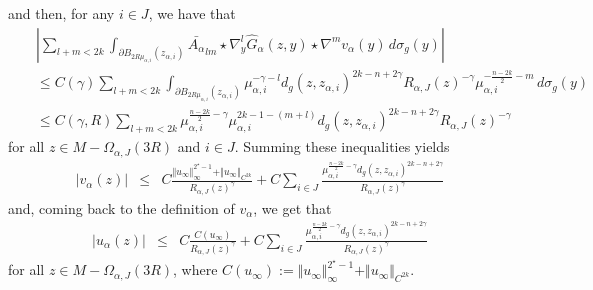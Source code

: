 \documentclass[reqno]{amsart}
\def \crit {2^\star}
\def \ua {u_\alpha}
\def \va {v_\alpha}
\def \mai {\mu_{\alpha,i}}
\def \zai {z_{\alpha,i}}
\begin{document}
and then, for any $i\in J$, we have that
\begin{eqnarray}
&&\left|\sum_{l+m<2k}\int_{\partial B_{2R\mai}(\zai)}\bar{A_\alpha}_{lm}\star\nabla^l_y\hat{G}_\alpha(z,y)\star \nabla^m v_\alpha (y)\, d\sigma_g(y)\right|\label{ineq:78}\\
&&\leq C(\gamma) \sum_{l+m<2k}\int_{\partial B_{2R\mai}(\zai)} \mai^{-\gamma-l}d_g(z,\zai)^{2k-n+2\gamma}R_{\alpha, J}(z)^{-\gamma}\mai^{-\frac{n-2k}{2}-m}\,  d\sigma_g(y)\nonumber\\
&&\leq C(\gamma,R) \sum_{l+m<2k} \mai^{\frac{n-2k}{2}-\gamma }\mai^{2k-1-(m+l)}d_g(z,\zai)^{2k-n+2\gamma}R_{\alpha, J}(z)^{-\gamma}\nonumber
\end{eqnarray}
for all $z\in M-\Omega_{\alpha,J}(3R)$ and $i\in J$. Summing these inequalities yields
\begin{eqnarray*}
|v_\alpha(z)|&\leq &C\frac{\Vert u_\infty \Vert_\infty^{\crit-1} +\Vert u_\infty\Vert_{C^{2k}}}{R_{\alpha, J}(z)^\gamma}+C\sum_{i\in J}\frac{\mai^{\frac{n-2k}{2}-\gamma }d_g(z,\zai)^{2k-n+2\gamma}}{R_{\alpha, J}(z)^{\gamma}}
\end{eqnarray*}
and, coming back to the definition of $\va$, we get that
\begin{eqnarray}\label{ineq:69}
|\ua(z)|&\leq &C\frac{C(u_\infty) }{R_{\alpha, J}(z)^\gamma}+C\sum_{i\in J}\frac{\mai^{\frac{n-2k}{2}-\gamma }d_g(z,\zai)^{2k-n+2\gamma}}{R_{\alpha, J}(z)^{\gamma}}
\end{eqnarray}
for all $z\in M-\Omega_{\alpha,J}(3R)$, where $C(u_\infty):=\Vert u_\infty \Vert_\infty^{\crit-1}+\Vert u_\infty \Vert_{C^{2k}}$.
\end{document}
